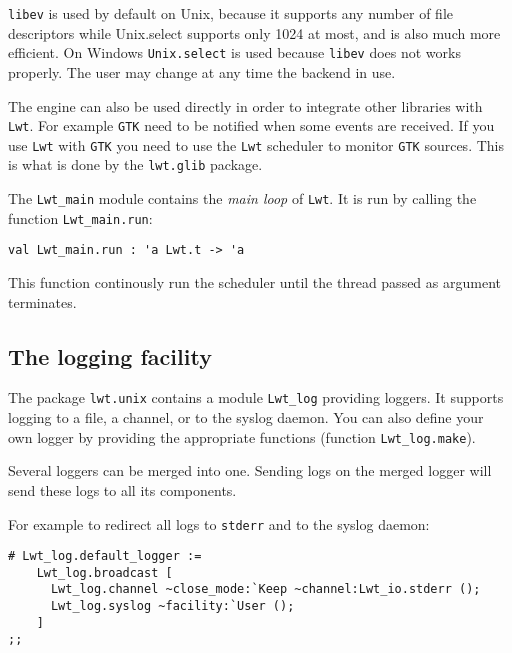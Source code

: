 {\tt libev} is used by default on Unix, because it supports any
number of file descriptors while Unix.select supports only 1024 at
most, and is also much more efficient. On Windows {\tt Unix.select}
is used because {\tt libev} does not works properly. The user may
change at any time the backend in use.



The engine can also be used directly in order to integrate other
libraries with {\tt Lwt}. For example {\tt GTK} need to be notified
when some events are received. If you use {\tt Lwt} with {\tt GTK}
you need to use the {\tt Lwt} scheduler to monitor {\tt GTK}
sources. This is what is done by the {\tt lwt.glib} package.



The {\tt Lwt\_main} module contains the \emph{main loop} of
{\tt Lwt}. It is run by calling the function {\tt Lwt\_main.run}:



\lstset{language=[Objective]Caml}\begin{lstlisting}
val Lwt_main.run : 'a Lwt.t -> 'a
\end{lstlisting}
\medskip

\noindent
This function continously run the scheduler until the thread passed
as argument terminates.



\subsection{ The logging facility }

The package {\tt lwt.unix} contains a module {\tt Lwt\_log}
providing loggers. It supports logging to a file, a channel, or to the
syslog daemon. You can also define your own logger by providing the
appropriate functions (function {\tt Lwt\_log.make}).



Several loggers can be merged into one. Sending logs on the merged
logger will send these logs to all its components.



For example to redirect all logs to {\tt stderr} and to the syslog
daemon:



\lstset{language=[Objective]Caml}\begin{lstlisting}
# Lwt_log.default_logger :=
    Lwt_log.broadcast [
      Lwt_log.channel ~close_mode:`Keep ~channel:Lwt_io.stderr ();
      Lwt_log.syslog ~facility:`User ();
    ]
;;
\end{lstlisting}
\medskip

